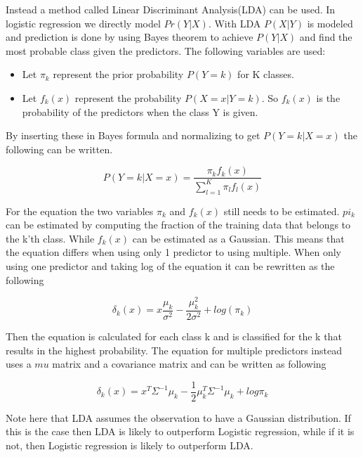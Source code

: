 Instead a method called Linear Discriminant Analysis(LDA) can be used. In logistic regression we directly model $Pr(Y|X)$. With LDA $P(X|Y)$ is modeled and prediction is done by using Bayes theorem to achieve $P(Y|X)$ and find the most probable class given the predictors. The following variables are used:

\begin{itemize}
	\item Let $\pi_k$ represent the prior probability $P(Y=k)$ for K classes.
	\item Let $f_k(x)$ represent the probability $P(X=x|Y=k)$. So $f_k(x)$ is the probability of the predictors when the class Y is given.
\end{itemize} 

By inserting these in Bayes formula and normalizing to get $P(Y=k|X=x)$ the following can be written.

\begin{equation}
P(Y=k|X = x) = \dfrac{\pi_k f_k(x)}{\sum_{l=1}^{K} \pi_l f_l(x)}
\end{equation}

For the equation the two variables $\pi_k$ and $f_k(x)$ still needs to be estimated. $pi_k$ can be estimated by computing the fraction of the training data that belongs to the k'th class. While $f_k(x)$ can be estimated as a Gaussian. This means that the equation differs when using only 1 predictor to using multiple. When only using one predictor and taking log of the equation it can be rewritten as the following

\begin{equation}
\delta_k(x) = x  \dfrac{\mu_k}{\sigma^2} - \dfrac{\mu_k^2}{2\sigma^2} + log(\pi_k)
\end{equation}

Then the equation is calculated for each class k and is classified for the k that results in the highest probability. The equation for multiple predictors instead uses a $mu$ matrix and a covariance matrix and can be written as following

\begin{equation}
\delta_k(x) = x^T \Sigma^{-1} \mu_k -  \frac{1}{2} \mu_k^{T} \Sigma^{-1} \mu_k + log \pi_k
\end{equation}

Note here that LDA assumes the observation to have a Gaussian distribution. If this is the case then LDA is likely to outperform Logistic regression, while if it is not, then Logistic regression is likely to outperform LDA. 

